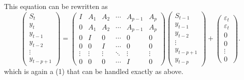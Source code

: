 \documentclass[12pt,fleqn]{article}
\newcommand{\vep}{\varepsilon}
\begin{document}
This equation can be rewritten as
\begin{equation*}
  \begin{pmatrix}
    S_t \\ y_t \\ y_{t-1} \\ y_{t-2} \\ \vdots \\ y_{t-p+1}
  \end{pmatrix}
  =
  \begin{pmatrix}
    I & A_1 & A_2 & \cdots & A_{p-1} & A_p \\
    0 & A_1 & A_2 & \cdots & A_{p-1} & A_p \\
    0 & I   & 0 & \cdots & 0 & 0 \\
    0 & 0   & I & \cdots & 0 & 0 \\
    \vdots & \vdots & \vdots & \ddots & \vdots & \vdots \\
    0 & 0 & 0 & \cdots & I & 0
  \end{pmatrix}
  \begin{pmatrix}
    S_{t-1}  \\ y_{t-1} \\ y_{t-2} \\ \vdots \\ y_{t-p+1} \\ y_{t-p}
  \end{pmatrix}
  +
  \begin{pmatrix}
    \vep_t \\ \vep_t \\ 0 \\ 0 \\ \vdots \\ 0
  \end{pmatrix}.
\end{equation*}
which is again a \VAR(1) that can be handled exactly as above.
\end{document}

